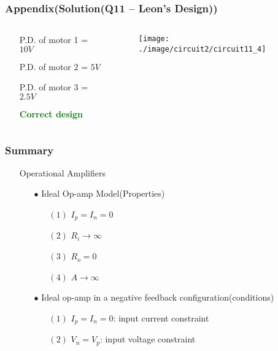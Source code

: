 \documentclass{beamer}
\newcommand{\green}[1]{\textcolor{green}{#1}}
\begin{document}

\begin{frame}
\frametitle{Appendix(Solution(Q11 -- Leon's Design))}
\begin{columns}
\begin{column}{5cm}
\begin{itemize} \itemsep1pt \parskip0pt 
  \item[] P.D. of motor 1 = $10V$
  \item[] P.D. of motor 2 = $5V$
  \item[] P.D. of motor 3 = $2.5V$
  \item[] \green{\bf Correct design}
\end{itemize}
\end{column}



\begin{column}{7cm}
\begin{figure}[H]
  \centering
  \texttt{[image: ./image/circuit2/circuit11\_4]}
\end{figure}
\end{column}
\end{columns}

\end{frame}

\begin{frame}
\frametitle{Summary}

\begin{itemize} \itemsep1pt \parskip0pt 
	\item[] Operational Amplifiers
  \begin{itemize} \itemsep1pt \parskip0pt 
    \item[$\bullet$] Ideal Op-amp Model(Properties)
    \begin{itemize}
      \item[$(1)$] $I_p = I_n = 0$
      \item[$(2)$] $R_i \rightarrow \infty$
      \item[$(3)$] $R_o = 0$
      \item[$(4)$] $A \rightarrow \infty$
    \end{itemize}
    \item[$\bullet$] Ideal op-amp in a negative feedback configuration(conditions)
    \begin{itemize}
      \item[$(1)$] $I_p = I_n = 0$: input current constraint
      \item[$(2)$] $V_n = V_p$: \hspace{4 mm}input voltage constraint
    \end{itemize}
  \end{itemize}
\end{itemize}

\end{frame}
\end{document}
